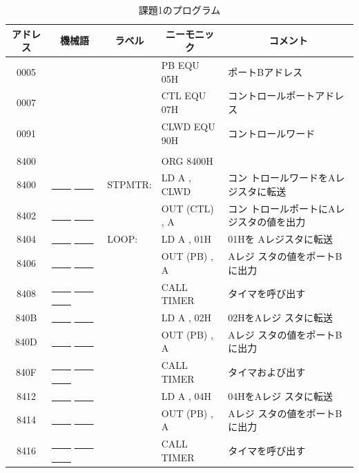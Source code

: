 \begin{description}
\begin{table}
\begin{center}
\caption{課題1のプログラム}
\label{tab:q2-1}
\footnotesize
\begin{tabular}{|c|l|ll|l|}
\hline
アドレス& \multicolumn{1}{|c|}{機械語}&\multicolumn{1}{|c}{ラベル}&\multicolumn{1}{c|}{ニーモニック}&\multicolumn{1}{|c|}{コメント}\\
\hline
   0005 &            &   &PB EQU 05H& ポートBアドレス\\
   0007 &            &   &CTL EQU 07H& コントロールポートアドレス\\
   0091 &            &   &CLWD EQU 90H& コントロールワード\\
        &            &   &&\\
   8400 &            &   &    ORG 8400H&\\
   8400 &  \underline{~~~~} \underline{~~~~}     &   STPMTR:& LD A , CLWD& コン
                    トロールワードをAレジスタに転送\\
   8402 &  \underline{~~~~} \underline{~~~~}      &   &    OUT (CTL) , A & コン
                    トロールポートにAレジスタの値を出力\\
   8404 &  \underline{~~~~} \underline{~~~~}       &   LOOP:& LD A , 01H& 01Hを
                    Aレジスタに転送\\
   8406 &  \underline{~~~~} \underline{~~~~}      &   &   OUT (PB) , A   & Aレジ
                    スタの値をポートBに出力\\
   8408 &  \underline{~~~~} \underline{~~~~}  \underline{~~~~}   &   &   CALL
                TIMER& タイマを呼び出す\\
   840B &  \underline{~~~~} \underline{~~~~}      &   &   LD A , 02H& 02HをAレジ
                    スタに転送\\
   840D &  \underline{~~~~} \underline{~~~~}     &   &   OUT (PB) , A   & Aレジ
                    スタの値をポートBに出力\\
   840F &  \underline{~~~~} \underline{~~~~} \underline{~~~~}  &   &   CALL
                TIMER& タイマおよび出す\\
   8412 &  \underline{~~~~} \underline{~~~~}     &   &   LD A , 04H& 04HをAレジ
                    スタに転送\\
   8414 &  \underline{~~~~} \underline{~~~~}      &   &   OUT (PB) , A   & Aレジ
                    スタの値をポートBに出力\\
   8416 &  \underline{~~~~} \underline{~~~~} \underline{~~~~}   &   &   CALL
                TIMER& タイマを呼び出す\\

\end{tabular}
\end{center}
\end{table}
\end{description}

